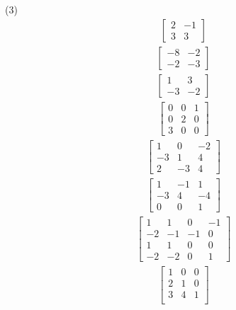 \begin{tasks}[resume, style=enumerate](3)
\task
  \begin{align*}
    \begin{bmatrix}
      2 & -1 \\
      3 & 3
    \end{bmatrix}
  \end{align*}
\task
  \begin{align*}
    \begin{bmatrix}
      -8 & -2 \\
      -2 & -3
    \end{bmatrix}
  \end{align*}
\task
  \begin{align*}
    \begin{bmatrix}
      1 & 3 \\
      -3 & -2
    \end{bmatrix}
  \end{align*}
\task
  \begin{align*}
    \begin{bmatrix}
      0 & 0 & 1 \\
      0 & 2 & 0 \\
      3 & 0 & 0
    \end{bmatrix}
  \end{align*}
\task
  \begin{align*}
    \begin{bmatrix}
      1 & 0 & -2 \\
      -3 & 1 & 4 \\
      2 & -3 & 4
    \end{bmatrix}
  \end{align*}
\task
  \begin{align*}
    \begin{bmatrix}
      1 & -1 & 1 \\
      -3 & 4 & -4 \\
      0 & 0 & 1
    \end{bmatrix}
  \end{align*}
\task
  \begin{align*}
    \begin{bmatrix}
      1 & 1 & 0 & -1 \\
      -2 & -1 & -1 & 0 \\
      1 & 1 & 0 & 0 \\
      -2 & -2 & 0 & 1
    \end{bmatrix}
  \end{align*}
\task
  \begin{align*}
    \begin{bmatrix}
      1 & 0 & 0 \\
      2 & 1 & 0 \\
      3 & 4 & 1 \\
    \end{bmatrix}
  \end{align*}
\end{tasks}
